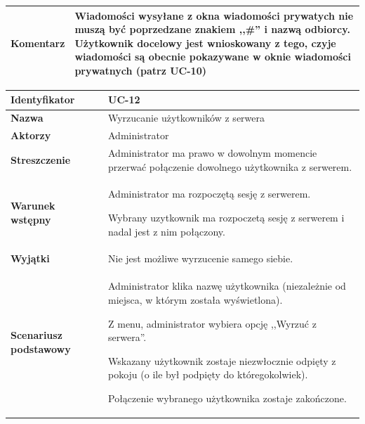 {\begin{tabular}{ | l | l | }
	\hline
		\textbf{Komentarz} & \parbox[t]{11cm}{
			Wiadomości wysyłane z okna wiadomości prywatych nie muszą być
			poprzedzane znakiem ,,\#'' i nazwą odbiorcy. Użytkownik docelowy
			jest wnioskowany z tego, czyje wiadomości są obecnie pokazywane w
			oknie wiadomości prywatnych (patrz UC-10)
		}
		\\

	\hline
\end{tabular}

\vspace{2em}

\begin{tabular}{ | l | l | }
	\hline
		\textbf{Identyfikator} &
		UC-12
		\\

	\hline
		\textbf{Nazwa} &
		Wyrzucanie użytkowników z serwera
		\\

	\hline
		\textbf{Aktorzy} & \parbox[t]{11cm}{
			Administrator
		}\\

	\hline
		\textbf{Streszczenie} & \parbox[t]{11cm}{
			Administrator ma prawo w dowolnym momencie przerwać połączenie dowolnego
			użytkownika z serwerem.

		}\\

	\hline
		\textbf{Warunek wstępny} & \parbox[t]{11cm}{
			\begin{enumreq}
				\item Administrator ma rozpoczętą sesję z serwerem.
				\item Wybrany uzytkownik ma rozpoczetą sesję z serwerem i nadal jest z
				nim połączony.
			\end{enumreq}

		}
		\\

	\hline
		\textbf{Wyjątki} & \parbox[t]{11cm}{
			Nie jest możliwe wyrzucenie samego siebie.
		}
		\\

	\hline
		\textbf{Scenariusz podstawowy} & \parbox[t]{11cm}{
			\begin{enumreq}
				\item Administrator klika nazwę użytkownika (niezależnie od miejsca, w
				którym została wyświetlona).
				\item Z menu, administrator wybiera opcję ,,Wyrzuć z serwera''.
				\item Wskazany użytkownik zostaje niezwłocznie odpięty z pokoju (o ile
				był podpięty do któregokolwiek).
				\item Połączenie wybranego użytkownika zostaje zakończone.
			\end{enumreq}
		}
		\\


\end{tabular}}
